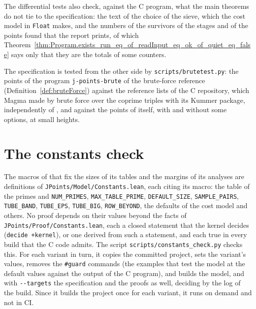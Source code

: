 The differential tests also check, against the C program, what the main theorems do not tie to the
specification: the text of the choice of the sieve, which the cost model in \verb|Float| makes, and
the numbers of the survivors of the stages and of the points found that the report prints, of which
Theorem~\ref{thm:Program.exists_run_eq_of_readInput_eq_ok_of_quiet_eq_false} says only that they are
the totals of some counters.

The specification is tested from the other side by \verb|scripts/brutetest.py|: the points of the
program \verb|j-points-brute| of the brute-force reference (Definition~\ref{def:bruteForce}) against
the reference lists of the C repository, which Magma made by brute force over the coprime triples
with its Kummer package, independently of \jpoints{}, and against the points of \jpoints{} itself,
with and without some options, at small heights.

\section{The constants check}\label{sec:ccodeConstants}

The macros of \jpoints{} that fix the sizes of its tables and the margins of its analyses are
definitions of \verb|JPoints/Model/Constants.lean|, each citing its macro: the table of the primes
and \verb|NUM_PRIMES|, \verb|MAX_TABLE_PRIME|, \verb|DEFAULT_SIZE|, \verb|SAMPLE_PAIRS|,
\verb|TUBE_BAND|, \verb|TUBE_EPS|, \verb|TUBE_BIG|, \verb|ROW_BEYOND|, the defaults of the cost
model and others. No proof depends on their values beyond the facts of
\verb|JPoints/Proof/Constants.lean|, each a closed statement that the kernel decides
(\verb|decide +kernel|), or one derived from such a statement, and each true in every build that
the C code admits. The script \verb|scripts/constants_check.py| checks this. For each
variant in turn, it copies the committed project, sets the variant's values, removes the
\verb|#guard| commands (the examples that test the model at the default values against the output of
the C program), and builds the model, and with \verb|--targets| the specification and the proofs as
well, deciding by the log of the build. Since it builds the project once for each variant, it runs
on demand and not in CI.

